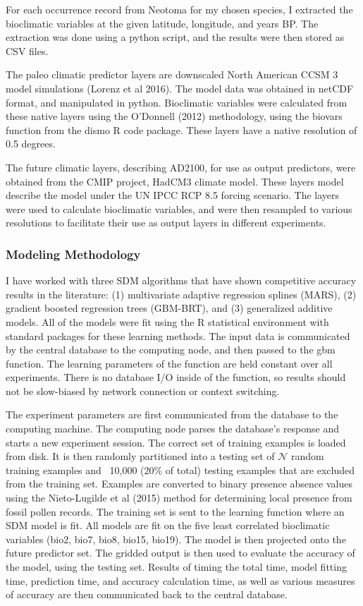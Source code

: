 \documentclass[a4paper]{article}
\begin{document}
For each occurrence record from Neotoma for my chosen species, I extracted the bioclimatic variables at the given latitude, longitude, and years BP. The extraction was done using a python script, and the results were then stored as CSV files.

The paleo climatic predictor layers are downscaled North American CCSM 3 model simulations (Lorenz et al 2016).  The model data was obtained in netCDF format, and manipulated in python.  Bioclimatic variables were calculated from these native layers using the O'Donnell (2012) methodology, using the biovars function from the dismo R code package.  These layers have a native resolution of 0.5 degrees.

The future climatic layers, describing AD2100, for use as output predictors, were obtained from the CMIP project, HadCM3 climate model.  These layers model describe the model under the UN IPCC RCP 8.5 forcing scenario.  The layers were used to calculate bioclimatic variables, and were then resampled to various resolutions to facilitate their use as output layers in different experiments.

\subsubsection{Modeling Methodology}
I have worked with three SDM algorithms that have shown competitive accuracy results in the literature: (1) multivariate adaptive regression splines (MARS), (2) gradient boosted regression trees (GBM-BRT), and (3) generalized additive models.  All of the models were fit using the R statistical environment with standard packages for these learning methods.
The input data is communicated by the central database to the computing node, and then passed to the gbm function.  The learning parameters of the function are held constant over all experiments.  There is no database I/O inside of the function, so results should not be slow-biased by network connection or context switching.  

The experiment parameters are first communicated from the database to the computing machine.  The computing node parses the database's response and starts a new experiment session.  The correct set of training examples is loaded from disk.  It is then randomly partitioned into a testing set of $\mathcal{N}$ random training examples and ~10,000 (20\% of total) testing examples that are excluded from the training set.  Examples are converted to binary presence absence values using the Nieto-Lugilde et al (2015) method for determining local presence from fossil pollen records.  The training set is sent to the learning function where an SDM model is fit.  All models are fit on the five least correlated bioclimatic variables (bio2, bio7, bio8, bio15, bio19). The model is then projected onto the future predictor set.  The gridded output is then used to evaluate the accuracy of the model, using the testing set. Results of timing the total time, model fitting time, prediction time, and accuracy calculation time, as well as various measures of accuracy are then communicated back to the central database. 
\end{document}
